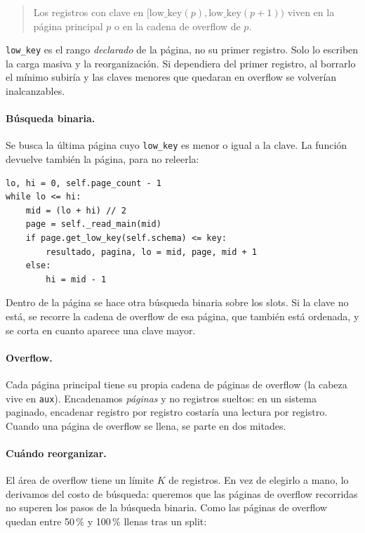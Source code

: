 \documentclass[11pt,a4paper]{article}
\newcommand{\code}[1]{\texttt{#1}}
\begin{document}
\begin{quote}
Los registros con clave en $[\text{low\_key}(p), \text{low\_key}(p+1))$ viven en la
página principal $p$ o en la cadena de overflow de $p$.
\end{quote}

\code{low\_key} es el rango \emph{declarado} de la página, no su primer registro.
Solo lo escriben la carga masiva y la reorganización. Si dependiera del primer
registro, al borrarlo el mínimo subiría y las claves menores que quedaran en overflow
se volverían inalcanzables.

\paragraph{Búsqueda binaria.} Se busca la última página cuyo \code{low\_key} es menor
o igual a la clave. La función devuelve también la página, para no releerla:

\begin{lstlisting}
lo, hi = 0, self.page_count - 1
while lo <= hi:
    mid = (lo + hi) // 2
    page = self._read_main(mid)
    if page.get_low_key(self.schema) <= key:
        resultado, pagina, lo = mid, page, mid + 1
    else:
        hi = mid - 1
\end{lstlisting}

Dentro de la página se hace otra búsqueda binaria sobre los slots. Si la clave no
está, se recorre la cadena de overflow de esa página, que también está ordenada, y se
corta en cuanto aparece una clave mayor.

\paragraph{Overflow.} Cada página principal tiene su propia cadena de páginas de
overflow (la cabeza vive en \code{aux}). Encadenamos \emph{páginas} y no registros
sueltos: en un sistema paginado, encadenar registro por registro costaría una lectura
por registro. Cuando una página de overflow se llena, se parte en dos mitades.

\paragraph{Cuándo reorganizar.} El área de overflow tiene un límite $K$ de
registros. En vez de elegirlo a mano, lo derivamos del costo de búsqueda: queremos
que las páginas de overflow recorridas no superen los pasos de la búsqueda binaria.
Como las páginas de overflow quedan entre 50\,\% y 100\,\% llenas tras un split:
\end{document}
